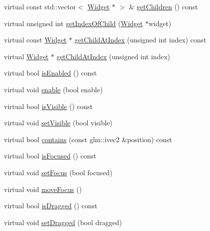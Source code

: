 \begin{DoxyCompactItemize}
\item 
virtual const std\+::vector$<$ \mbox{\hyperlink{classec__gui_1_1_widget}{Widget}} $\ast$ $>$ \& \mbox{\hyperlink{classec__gui_1_1_widget_ab8fa4e536b74b1dccec04cf79f70ac0e}{get\+Children}} () const
\item 
virtual unsigned int \mbox{\hyperlink{classec__gui_1_1_widget_ac5e50192f757b61c1cb1e9adbd171222}{get\+Index\+Of\+Child}} (\mbox{\hyperlink{classec__gui_1_1_widget}{Widget}} $\ast$widget)
\item 
virtual const \mbox{\hyperlink{classec__gui_1_1_widget}{Widget}} $\ast$ \mbox{\hyperlink{classec__gui_1_1_widget_aafd098af0f1918fe1998923b3b79b315}{get\+Child\+At\+Index}} (unsigned int index) const
\item 
virtual \mbox{\hyperlink{classec__gui_1_1_widget}{Widget}} $\ast$ \mbox{\hyperlink{classec__gui_1_1_widget_a962c2593c1cf63a6076849941f800a8d}{get\+Child\+At\+Index}} (unsigned int index)
\item 
virtual bool \mbox{\hyperlink{classec__gui_1_1_widget_a9a2d2abab5a579dc241d672b1070e446}{is\+Enabled}} () const
\item 
virtual void \mbox{\hyperlink{classec__gui_1_1_widget_aa1f6918bb9e69eb81aedd6e6b895434e}{enable}} (bool enable)
\item 
virtual bool \mbox{\hyperlink{classec__gui_1_1_widget_a77ddedd59f4761e59f0b031114187c11}{is\+Visible}} () const
\item 
virtual void \mbox{\hyperlink{classec__gui_1_1_widget_a50854d9055bafd7134b3f17b5bb619a8}{set\+Visible}} (bool visible)
\item 
virtual bool \mbox{\hyperlink{classec__gui_1_1_widget_a90f689c8153f17454ce2d52458703a26}{contains}} (const glm\+::ivec2 \&position) const
\item 
virtual bool \mbox{\hyperlink{classec__gui_1_1_widget_ac9238d9305d5ddf60c03148168883010}{is\+Focused}} () const
\item 
virtual void \mbox{\hyperlink{classec__gui_1_1_widget_a0f4c330b12beaac5cfbd97ecc1f4fee3}{set\+Focus}} (bool focused)
\item 
virtual void \mbox{\hyperlink{classec__gui_1_1_widget_a3bb9779e3cb70af3f70df060753d24ae}{move\+Focus}} ()
\item 
virtual bool \mbox{\hyperlink{classec__gui_1_1_widget_a338db35bc10a565da7adade008bd4b35}{is\+Dragged}} () const
\item 
virtual void \mbox{\hyperlink{classec__gui_1_1_widget_ac2b789cec74b8b5cfa0c6a8f4d6e786f}{set\+Dragged}} (bool dragged)
\item 

\end{DoxyCompactItemize}
